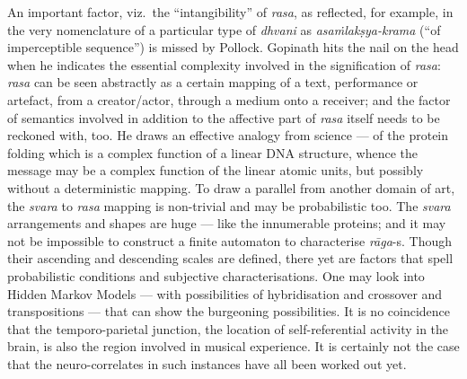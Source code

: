 An important factor, viz.\ the “intangibility” of \textsl{rasa}, as reflected, for example, in the very nomenclature of a particular type of \textsl{dhvani} as \textsl{asaṁlakṣya-krama} (“of imperceptible sequence”) is missed by Pollock. Gopinath hits the nail on the head when he indicates the essential complexity involved in the signification of \textsl{rasa}: \textsl{rasa} can be seen abstractly as a certain mapping of a text, performance or artefact, from a creator/actor, through a medium onto a receiver; and the factor of semantics involved in addition to the affective part of \textsl{rasa} itself needs to be reckoned with, too. He draws an effective analogy from science --- of the protein folding which is a complex function of a linear DNA structure, whence the message may be a complex function of the linear atomic units, but possibly without a deterministic mapping. To draw a parallel from another domain of art, the \textsl{svara} to \textsl{rasa} mapping is non-trivial and may be probabilistic too. The \textsl{svara} arrangements and shapes are huge --- like the innumerable proteins; and it may not be impossible to construct a finite automaton to characterise \textsl{rāga}-s.  Though their ascending and descending scales are defined, there yet are factors that spell probabilistic conditions and subjective characterisations. One may look into Hidden Markov Models --- with possibilities of hybridisation and crossover and transpositions --- that can show the burgeoning possibilities. It is no coincidence that the temporo-parietal junction, the location of self-referential activity in the brain, is also the region involved in musical experience. It is certainly not the case that the neuro-correlates in such instances have all been worked out yet.


